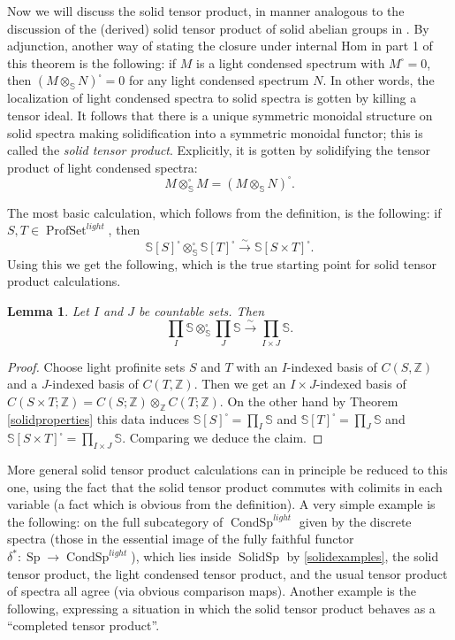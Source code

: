 \documentclass[12pt]{article}
\newtheorem{lemma}[theorem]{Lemma}
\newcommand{\on}{\operatorname}
\begin{document}
Now we will discuss the solid tensor product, in manner analogous to the discussion of the (derived) solid tensor product of solid abelian groups in \cite{ClausenCondensed}.  By adjunction, another way of stating the closure under internal Hom in part 1 of this theorem is the following: if $M$ is a light condensed spectrum with $M^\square=0$, then $(M\otimes_\mathbb{S} N)^{\square}=0$ for any light condensed spectrum $N$.  In other words, the localization of light condensed spectra to solid spectra is gotten by killing a tensor ideal.  It follows that there is a unique symmetric monoidal structure on solid spectra making solidification into a symmetric monoidal functor; this is called the \emph{solid tensor product}.  Explicitly, it is gotten by solidifying the tensor product of light condensed spectra:
$$M\otimes^\square_{\mathbb{S}}M = (M\otimes_\mathbb{S} N)^\square.$$

The most basic calculation, which follows from the definition, is the following: if $S,T\in\on{ProfSet}^{light}$, then
$$\mathbb{S}[S]^\square\otimes^\square_{\mathbb{S}}\mathbb{S}[T]^{\square} \overset{\sim}{\rightarrow}\mathbb{S}[S\times T]^\square.$$
Using this we get the following, which is the true starting point for solid tensor product calculations.
\begin{lemma}\label{tensorproduct}
Let $I$ and $J$ be countable sets.  Then
$$\prod_I \mathbb{S} \otimes^\square_{\mathbb{S}} \prod_J \mathbb{S} \overset{\sim}{\rightarrow} \prod_{I\times J}\mathbb{S}.$$
\end{lemma}
\begin{proof}
Choose light profinite sets $S$ and $T$ with an $I$-indexed basis of $C(S,\mathbb{Z})$ and a $J$-indexed basis of $C(T,\mathbb{Z})$.  Then we get an $I\times J$-indexed basis of $C(S\times T;\mathbb{Z})=C(S;\mathbb{Z})\otimes_\mathbb{Z} C(T;\mathbb{Z})$.  On the other hand by Theorem \ref{solidproperties} this data induces $\mathbb{S}[S]^\square = \prod_I \mathbb{S}$ and $\mathbb{S}[T]^\square = \prod_J \mathbb{S}$ and $\mathbb{S}[S\times T]^{\square}=\prod_{I\times J}\mathbb{S}$.  Comparing we deduce the claim.
\end{proof}

More general solid tensor product calculations can in principle be reduced to this one, using the fact that the solid tensor product commutes with colimits in each variable (a fact which is obvious from the definition).  A very simple example is the following: on the full subcategory of $\on{CondSp}^{light}$ given by the discrete spectra (those in the essential image of the fully faithful functor $\delta^\ast:\on{Sp}\to\on{CondSp}^{light}$), which lies inside $\on{SolidSp}$ by \ref{solidexamples}, the solid tensor product, the light condensed tensor product, and the usual tensor product of spectra all agree (via obvious comparison maps).  Another example is the following, expressing a situation in which the solid tensor product behaves as a ``completed tensor product''.
\end{document}
